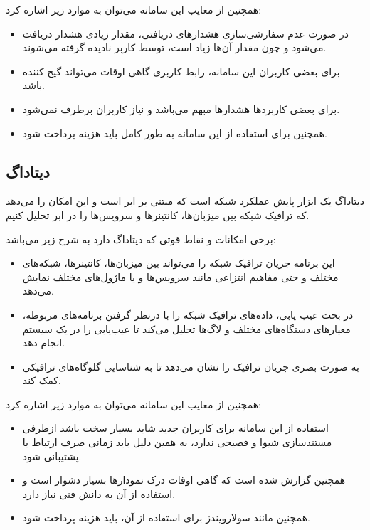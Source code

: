 همچنین از معایب این سامانه می‌توان به موارد زیر اشاره کرد:



\begin{itemize}
    \item در صورت عدم سفارشی‌سازی هشدارهای دریافتی، مقدار زیادی هشدار دریافت می‌شود و چون مقدار آن‌ها زیاد است، توسط کاربر نادیده گرفته می‌شوند.
    \item برای بعضی کاربران این سامانه، رابط کاربری گاهی اوقات می‌تواند گیج کننده باشد.
    \item برای بعضی کاربردها هشدارها مبهم می‌باشد و نیاز کاربران برطرف نمی‌شود.
    \item همچنین برای استفاده از این سامانه به طور کامل باید هزینه پرداخت شود.
\end{itemize}


\subsection{دیتاداگ}

دیتاداگ یک ابزار پایش عملکرد شبکه است که مبتنی بر ابر است و این امکان را می‌دهد که ترافیک شبکه بین میزبان‌ها، کانتینرها و سرویس‌ها را در ابر تحلیل کنیم.

\newpage
برخی امکانات و نقاط قوتی که دیتاداگ دارد به شرح زیر می‌باشد:

\begin{itemize}
    \item این برنامه جریان ترافیک شبکه را می‌تواند بین میزبان‌ها، کانتینرها، شبکه‌های مختلف و حتی مفاهیم انتزاعی مانند سرویس‌ها و یا ماژول‌های مختلف نمایش می‌دهد. 
    \item در بحث عیب یابی، داده‌های ترافیک شبکه را با درنظر گرفتن برنامه‌های مربوطه، معیارهای دستگاه‌های مختلف و لاگ‌ها تحلیل می‌کند تا عیب‌یابی را در یک سیستم انجام دهد.
    \item به صورت بصری جریان ترافیک را نشان می‌دهد تا به شناسایی گلوگاه‌های ترافیکی کمک کند.
\end{itemize}

همچنین از معایب این سامانه می‌توان به موارد زیر اشاره کرد:


\begin{itemize}
    \item استفاده از این سامانه برای کاربران جدید شاید بسیار سخت باشد ازطرفی مستندسازی شیوا و فصیحی ندارد، به همین دلیل باید زمانی صرف ارتباط با پشتیبانی شود.
    \item همچنین گزارش شده است که گاهی اوقات درک نمودارها بسیار دشوار است و استفاده از آن به دانش فنی نیاز دارد.
    \item همچنین مانند سولارویندز برای استفاده از آن، باید هزینه پرداخت شود.
\end{itemize}


